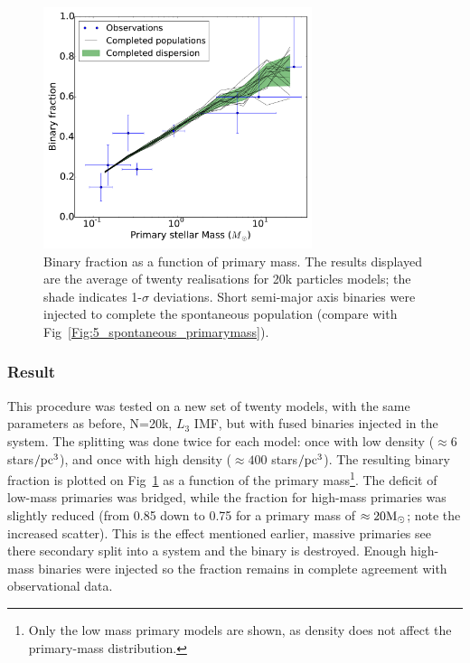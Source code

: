 \begin{figure}
\begin{center}
\includegraphics[width=0.7\textwidth]{Figures/5_completed_primarymass}
\caption{Binary fraction as a function of primary mass. The results displayed are the average of twenty realisations for 20k particles models; the shade indicates 1-$\sigma$ deviations. Short semi-major axis binaries were injected to complete the spontaneous population (compare with Fig~\protect\ref{Fig:5_spontaneous_primarymass}).}
\label{Fig:5_completed_primarymass}
\end{center}
\end{figure}

\subsubsection*{Result}

This procedure was tested on a new set of \HubLem twenty models, with the same parameters as before, N=20k, $L_3$ IMF, but with fused binaries injected in the system. The splitting was done twice for each model:  once with low density ($\approx 6$ stars$/{\textrm{pc}}^3$), and once with high density ($\approx 400$ stars$/{\textrm{pc}}^3$). The resulting binary fraction is plotted on Fig~\ref{Fig:5_completed_primarymass} as a function of the primary mass\footnote{Only the low mass primary models are shown, as density does not affect the primary-mass distribution.}. The deficit of low-mass primaries was bridged, while the fraction for high-mass primaries was slightly reduced (from 0.85 down to 0.75 for a primary mass of $\approx 20 {\textrm{M}_\odot}$; note the increased scatter). This is the effect mentioned earlier, massive primaries see there secondary split into a system and the binary is destroyed. Enough high-mass binaries were injected so the fraction remains in complete agreement with observational data.

